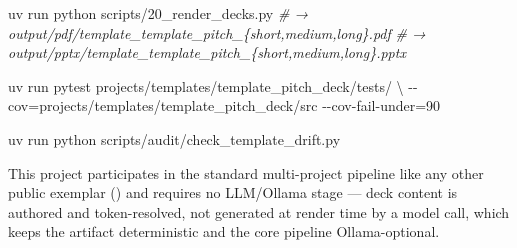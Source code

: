 \documentclass[
  english,
]{article}
\newenvironment{Shaded}{}{}
\newcommand{\AttributeTok}[1]{\textcolor[rgb]{0.49,0.56,0.16}{#1}}
\newcommand{\CommentTok}[1]{\textcolor[rgb]{0.38,0.63,0.69}{\textit{#1}}}
\newcommand{\DataTypeTok}[1]{\textcolor[rgb]{0.56,0.13,0.00}{#1}}
\newcommand{\ExtensionTok}[1]{#1}
\newcommand{\NormalTok}[1]{#1}
\newcommand{\OperatorTok}[1]{\textcolor[rgb]{0.40,0.40,0.40}{#1}}
\begin{document}
\begin{Shaded}
\begin{Highlighting}[]
\ExtensionTok{uv}\NormalTok{ run python scripts/20\_render\_decks.py}
\CommentTok{\# → output/pdf/template\_template\_pitch\_\{short,medium,long\}.pdf}
\CommentTok{\# → output/pptx/template\_template\_pitch\_\{short,medium,long\}.pptx}

\ExtensionTok{uv}\NormalTok{ run pytest projects/templates/template\_pitch\_deck/tests/ }\DataTypeTok{\textbackslash{}}
  \AttributeTok{{-}{-}cov}\OperatorTok{=}\NormalTok{projects/templates/template\_pitch\_deck/src }\AttributeTok{{-}{-}cov{-}fail{-}under}\OperatorTok{=}\NormalTok{90}

\ExtensionTok{uv}\NormalTok{ run python scripts/audit/check\_template\_drift.py}
\end{Highlighting}
\end{Shaded}

This project participates in the standard multi-project pipeline like
any other public exemplar
()
and requires no LLM/Ollama stage --- deck content is authored and
token-resolved, not generated at render time by a model call, which
keeps the artifact deterministic and the core pipeline Ollama-optional.

\newpage



\clearpage


\end{document}
